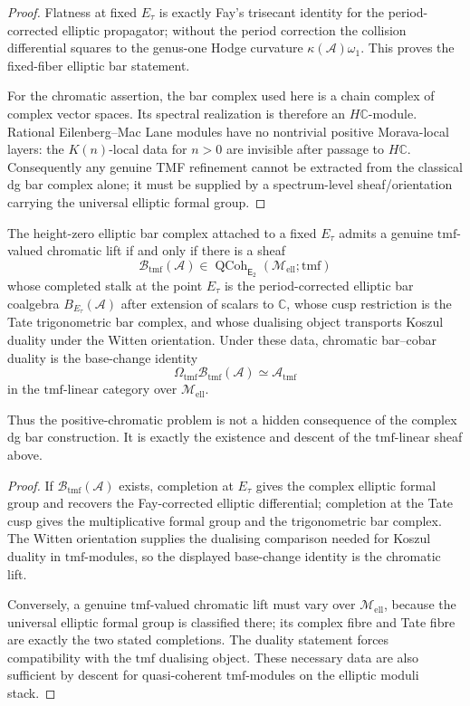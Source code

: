 \documentclass[11pt]{article}
\newcommand{\cA}{\mathcal{A}}
\newcommand{\C}{\mathbb{C}}
\newcommand{\Etwo}{\mathsf{E}_2}
\begin{document}
\begin{proof}
Flatness at fixed $E_\tau$ is exactly Fay's trisecant identity
for the period-corrected elliptic propagator; without the period
correction the collision differential squares to the genus-one
Hodge curvature $\kappa(\cA)\omega_1$.  This proves the
fixed-fiber elliptic bar statement.

For the chromatic assertion, the bar complex used here is a
chain complex of complex vector spaces.  Its spectral realization
is therefore an $H\C$-module.  Rational Eilenberg--Mac Lane
modules have no nontrivial positive Morava-local layers: the
$K(n)$-local data for $n>0$ are invisible after passage to
$H\C$.  Consequently any genuine TMF refinement cannot be
extracted from the classical dg bar complex alone; it must be
supplied by a spectrum-level sheaf/orientation carrying the
universal elliptic formal group.
\end{proof}

\begin{theorem}
\label{thm:tmf-lift-criterion-chromatic-bar-cobar}
The height-zero elliptic bar complex attached to a fixed
$E_\tau$ admits a genuine $\mathrm{tmf}$-valued chromatic lift
if and only if there is a sheaf
\[
  \mathscr B_{\mathrm{tmf}}(\cA)
  \in
  \operatorname{QCoh}_{\Etwo}(\mathcal M_{\mathrm{ell}};\mathrm{tmf})
\]
whose completed stalk at the point $E_\tau$ is the period-corrected
elliptic bar coalgebra $B_{E_\tau}(\cA)$ after extension of
scalars to $\C$, whose cusp restriction is the Tate
trigonometric bar complex, and whose dualising object transports
Koszul duality under the Witten orientation.  Under these data,
chromatic bar--cobar duality is the base-change identity
\[
  \Omega_{\mathrm{tmf}}
  \mathscr B_{\mathrm{tmf}}(\cA)
  \simeq
  \mathscr A_{\mathrm{tmf}}
\]
in the $\mathrm{tmf}$-linear category over
$\mathcal M_{\mathrm{ell}}$.

Thus the positive-chromatic problem is not a hidden consequence
of the complex dg bar construction.  It is exactly the existence
and descent of the $\mathrm{tmf}$-linear sheaf above.
\end{theorem}

\begin{proof}
If $\mathscr B_{\mathrm{tmf}}(\cA)$ exists, completion at
$E_\tau$ gives the complex elliptic formal group and recovers the
Fay-corrected elliptic differential; completion at the Tate cusp
gives the multiplicative formal group and the trigonometric
bar complex.  The Witten orientation supplies the dualising
comparison needed for Koszul duality in $\mathrm{tmf}$-modules,
so the displayed base-change identity is the chromatic lift.

Conversely, a genuine $\mathrm{tmf}$-valued chromatic lift must
vary over $\mathcal M_{\mathrm{ell}}$, because the universal
elliptic formal group is classified there; its complex fibre and
Tate fibre are exactly the two stated completions.  The duality
statement forces compatibility with the $\mathrm{tmf}$ dualising
object.  These necessary data are also sufficient by descent for
quasi-coherent $\mathrm{tmf}$-modules on the elliptic moduli
stack.
\end{proof}
\end{document}
